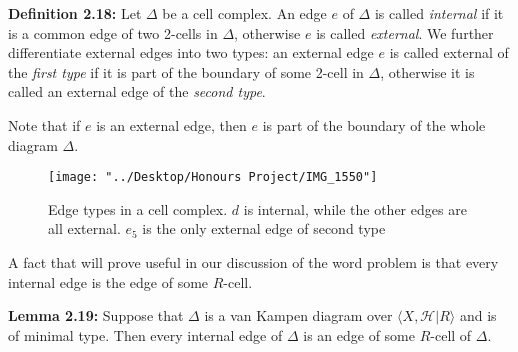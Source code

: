 \documentclass[12pt]{article}
\newcommand{\vs}{\vskip10pt}
\begin{document}
	\vs 
	
	\textbf{Definition 2.18: } Let $\Delta$ be a cell complex. An edge $e$ of $\Delta$ is called \textit{internal} if it is a common edge of two 2-cells in $\Delta$, otherwise $e$ is called \textit{external}. We further differentiate external edges into two types: an external edge $e$ is called external of the \textit{first type} if it is part of the boundary of some 2-cell in $\Delta$, otherwise it is called an external edge of the \textit{second type}. 
	
	\vs
	
	Note that if $e$ is an external edge, then $e$ is part of the boundary of the whole diagram $\Delta$. 
	
\begin{figure} [H]
	\centering
	\texttt{[image: "../Desktop/Honours Project/IMG\_1550"]}
	\caption{Edge types in a cell complex. $d$ is internal, while the other edges are all external. $e_5$ is the only external edge of second type}
	\label{fig:img1550}
\end{figure}
	
	
	\vs 
	
	A fact that will prove useful in our discussion of the word problem is that every internal edge is the edge of some $R$-cell. 
	
	\vs 
	
	\textbf{Lemma 2.19: } Suppose that $\Delta$ is a van Kampen diagram over $\langle X, \mathcal{H} \vert R \rangle$ and is of minimal type. Then every internal edge of $\Delta$ is an edge of some $R$-cell of $\Delta$. 
	
\end{document}
